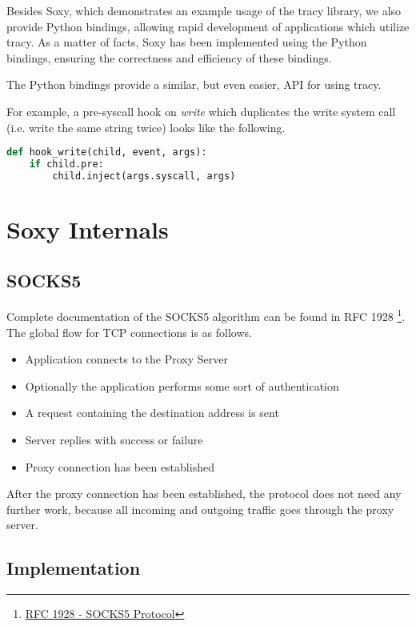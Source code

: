 \documentclass[a4paper, 10pt]{report}
\begin{document}
Besides Soxy, which demonstrates an example usage of the tracy library, we
also provide Python bindings, allowing rapid development of applications
which utilize tracy. As a matter of facts, Soxy has been implemented using the
Python bindings, ensuring the correctness and efficiency of these bindings.

The Python bindings provide a similar, but even easier, API for using tracy.

For example, a pre-syscall hook on \textit{write} which duplicates the write
system call (i.e. write the same string twice) looks like the following.

\begin{lstlisting}[language=Python]
def hook_write(child, event, args):
    if child.pre:
        child.inject(args.syscall, args)
\end{lstlisting}

\section{Soxy Internals}

\subsection{SOCKS5}

Complete documentation of the SOCKS5 algorithm can be found in
RFC 1928 \footnote{\href{http://www.ietf.org/rfc/rfc1928.txt}
{RFC 1928 - SOCKS5 Protocol}}. The global flow for TCP connections
is as follows.

\begin{itemize}
\item Application connects to the Proxy Server
\item Optionally the application performs some sort of authentication
\item A request containing the destination address is sent
\item Server replies with success or failure
\item Proxy connection has been established
\end{itemize}

After the proxy connection has been established, the protocol does not need
any further work, because all incoming and outgoing traffic goes through the
proxy server.

\subsection{Implementation}
\end{document}
